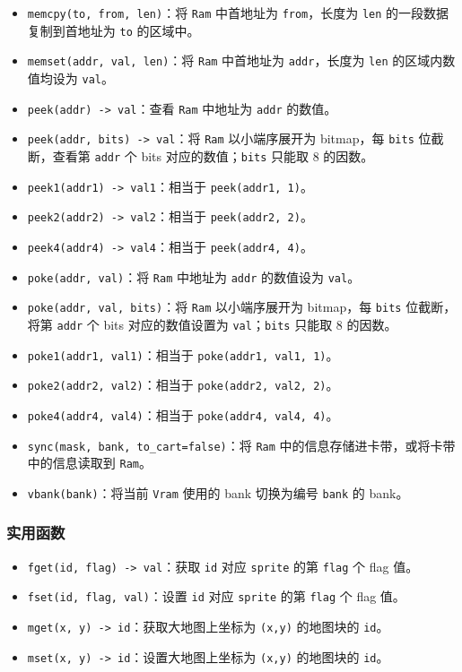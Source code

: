 \documentclass[UTF8]{ctexart}
\begin{document}
\begin{itemize}
    \item \texttt{memcpy(to, from, len)}：将 \texttt{Ram} 中首地址为 \texttt{from}，长度为 \texttt{len} 的一段数据复制到首地址为 \texttt{to} 的区域中。
    \item \texttt{memset(addr, val, len)}：将 \texttt{Ram} 中首地址为 \texttt{addr}，长度为 \texttt{len} 的区域内数值均设为 \texttt{val}。
    \item \texttt{peek(addr) -> val}：查看 \texttt{Ram} 中地址为 \texttt{addr} 的数值。
    \item \texttt{peek(addr, bits) -> val}：将 \texttt{Ram} 以小端序展开为 bitmap，每 \texttt{bits} 位截断，查看第 \texttt{addr} 个 bits 对应的数值；\texttt{bits} 只能取 8 的因数。
    \item \texttt{peek1(addr1) -> val1}：相当于 \texttt{peek(addr1, 1)}。
    \item \texttt{peek2(addr2) -> val2}：相当于 \texttt{peek(addr2, 2)}。
    \item \texttt{peek4(addr4) -> val4}：相当于 \texttt{peek(addr4, 4)}。
    \item \texttt{poke(addr, val)}：将 \texttt{Ram} 中地址为 \texttt{addr} 的数值设为 \texttt{val}。
    \item \texttt{poke(addr, val, bits)}：将 \texttt{Ram} 以小端序展开为 bitmap，每 \texttt{bits} 位截断，将第 \texttt{addr} 个 bits 对应的数值设置为 \texttt{val}；\texttt{bits} 只能取 8 的因数。
    \item \texttt{poke1(addr1, val1)}：相当于 \texttt{poke(addr1, val1, 1)}。
    \item \texttt{poke2(addr2, val2)}：相当于 \texttt{poke(addr2, val2, 2)}。
    \item \texttt{poke4(addr4, val4)}：相当于 \texttt{poke(addr4, val4, 4)}。
    \item \texttt{sync(mask, bank, to\_cart=false)}：将 \texttt{Ram} 中的信息存储进卡带，或将卡带中的信息读取到 \texttt{Ram}。
    \item \texttt{vbank(bank)}：将当前 \texttt{Vram} 使用的 bank 切换为编号 \texttt{bank} 的 bank。
\end{itemize}

\subsubsection{实用函数}

\begin{itemize}
    \item \texttt{fget(id, flag) -> val}：获取 \texttt{id} 对应 \texttt{sprite} 的第 \texttt{flag} 个 flag 值。
    \item \texttt{fset(id, flag, val)}：设置 \texttt{id} 对应 \texttt{sprite} 的第 \texttt{flag} 个 flag 值。
    \item \texttt{mget(x, y) -> id}：获取大地图上坐标为 \texttt{(x,y)} 的地图块的 \texttt{id}。
    \item \texttt{mset(x, y) -> id}：设置大地图上坐标为 \texttt{(x,y)} 的地图块的 \texttt{id}。
\end{itemize}
\end{document}

